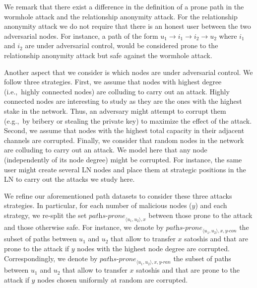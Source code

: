 We remark that there exist a difference in the definition of a prone path in the wormhole attack and the relationship anonymity attack. 
For the relationship anonymity attack we do not require that there is an honest user between the two adversarial nodes.
For instance, a path of the form $u_1 \rightarrow i_1 \rightarrow i_2 \rightarrow u_2$ where $i_1$ and $i_2$ are under adversarial control,  would be considered prone to the relationship anonymity attack but safe against the wormhole attack. 

Another aspect that we consider is which nodes are under adversarial control.
We follow three strategies. 
First, we assume that nodes with highest degree (i.e.,~highly connected nodes) are colluding to carry out an attack. 
Highly connected nodes are interesting to study as they are the ones with the highest stake in the network. 
Thus, an adversary might attempt to corrupt them (e.g.,~by bribery or stealing the private key) to maximize the effect of the attack. 
Second, we assume that nodes with the highest total capacity in their adjacent channels are corrupted.
Finally, we consider that random nodes in the network are colluding to carry out an attack. 
We model here that any node (independently of its node degree) might be corrupted.
For instance, the same user might create several LN nodes and place them at strategic positions in the LN to carry out the attacks we study here. 

We refine our aforementioned path datasets to consider these three attacks strategies.
In particular, for each number of malicious nodes ($y$) and each strategy, we re-split the set $\textit{paths-prone}_{\langle u_1, u_2 \rangle, x}$ 
between those prone to the attack and those otherwise safe. 
For instance, we denote by $\textit{paths-prone}_{\langle u_1, u_2 \rangle, x, y\textit{-con}}$ 
the subset of paths between 
$u_1$ and $u_2$ that allow to transfer $x$ satoshis and that are prone 
to the attack if $y$ nodes with the highest node degree are corrupted. 
Correspondingly, we denote by $\textit{paths-prone}_{\langle u_1, u_2 \rangle, x, y\textit{-ran}}$ 
the subset of paths between 
$u_1$ and $u_2$ that allow to transfer $x$ satoshis and that are prone 
to the attack if $y$ nodes chosen uniformly at random are corrupted. 

